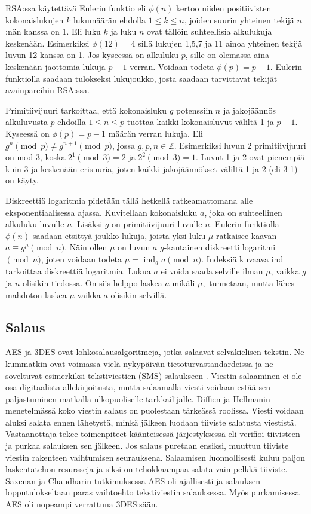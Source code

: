 \documentclass[finnish]{tktltiki2}
\theoremstyle{definition}
\theoremstyle{remark}
\begin{document}
RSA:ssa käytettävä Eulerin funktio eli $\phi(n)$ kertoo niiden positiivisten kokonaislukujen $k$ lukumäärän ehdolla $1 \leq k \leq n$, joiden suurin yhteinen tekijä $n$:nän kanssa on 1. Eli luku $k$ ja luku $n$ ovat tällöin suhteellisia alkulukuja keskenään. Esimerkiksi $\phi(12) = 4$ sillä lukujen 1,5,7 ja 11 ainoa yhteinen tekijä luvun 12 kanssa on 1. Jos kyseessä on alkuluku $p$, sille on olemassa aina  keskenään jaottomia lukuja $p - 1$ verran. Voidaan todeta $\phi(p) = p -1$. Eulerin funktiolla saadaan tulokseksi lukujoukko, josta saadaan tarvittavat tekijät avainpareihin RSA:ssa. \cite{tot}
	
Primitiivijuuri tarkoittaa, että kokonaisluku $g$ potenssiin $n$ ja jakojäännös alkuluvusta $p$ ehdoilla $1 \leq n \leq p$ tuottaa kaikki kokonaisluvut väliltä 1 ja $p-1$. Kyseessä on $\phi(p) = p - 1$ määrän verran lukuja. Eli $g^n \pmod{p} \neq g^{n+1} \pmod{p}$, jossa $g, p, n \in \mathbb{Z}$. Esimerkiksi luvun 2 primitiivijuuri on mod 3, koska $2^1 \pmod{3} = 2$ ja $2^2 \pmod{3} = 1$. Luvut 1 ja 2 ovat pienempiä kuin 3 ja keskenään erisuuria, joten kaikki jakojäännökset väliltä 1 ja 2 (eli 3-1) on käyty. \cite{prim}

Diskreettiä logaritmia pidetään tällä hetkellä ratkeamattomana alle eksponentiaalisessa ajassa. Kuvitellaan kokonaisluku $a$, joka on suhteellinen alkuluku luvulle $n$. Lisäksi $g$ on primitiivijuuri luvulle $n$. Eulerin funktiolla $\phi(n)$ saadaan etsittyä joukko lukuja, joista yksi luku $\mu$ ratkaisee kaavan  $a \equiv g^{\mu} \pmod{n}$. Näin ollen $\mu$ on luvun $a$ $g$-kantainen diskreetti logaritmi $\pmod{n}$, joten voidaan todeta $\mu = $ ind$_g$ $a\pmod{n}$. Indeksiä kuvaava ind tarkoittaa diskreettiä logaritmia. Lukua $a$ ei voida saada selville ilman $\mu$, vaikka $g$ ja $n$ olisikin tiedossa. On siis helppo laskea $a$ mikäli $\mu, $ tunnetaan, mutta lähes mahdoton laskea $\mu$ vaikka $a$ olisikin selvillä. \cite{disc}

\subsection{Salaus} 

AES ja 3DES ovat lohkosalausalgoritmeja, jotka salaavat selväkielisen tekstin. Ne kummatkin ovat voimassa vielä nykypäivän tietoturvastandardeissa ja ne soveltuvat esimerkiksi tekstiviestien (SMS) salaukseen \cite{gsm}. Viestin salaaminen ei ole osa digitaalista allekirjoitusta, mutta salaamalla viesti voidaan estää sen paljastuminen matkalla ulkopuoliselle tarkkailijalle. Diffien ja Hellmanin menetelmässä koko viestin salaus on puolestaan tärkeässä roolissa. Viesti voidaan aluksi salata ennen lähetystä, minkä jälkeen luodaan tiiviste salatusta viestistä. Vastaanottaja tekee toimenpiteet käänteisessä järjestyksessä eli verifioi tiivisteen ja purkaa salauksen sen jälkeen. Jos salaus puretaan ensiksi, muuttuu tiiviste viestin rakenteen vaihtumisen seurauksena. Salaamisen luonnollisesti kuluu paljon laskentatehon resursseja ja siksi on tehokkaampaa salata vain pelkkä tiiviste. Saxenan ja Chaudharin \cite{gsm} tutkimuksessa AES oli ajallisesti ja salauksen lopputulokseltaan paras vaihtoehto tekstiviestin salauksessa. Myös purkamisessa AES oli nopeampi verrattuna 3DES:sään. 
\end{document}
